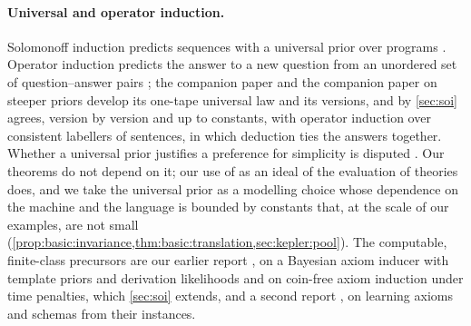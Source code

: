 \paragraph{Universal and operator induction.}
Solomonoff induction predicts sequences with a universal prior over programs \citep{solomonoff1964formal,solomonoff1978complexity,li2008introduction}. Operator induction predicts the answer to a new question from an unordered set of question--answer pairs \citep{solomonoff1999two,solomonoff2008three}; the companion paper \citep{claudeSFI2026fundamentals} and the companion paper on steeper priors \citep{claudeSFI2026steeper} develop its one-tape universal law and its versions, and by \cref{sec:soi} \SAIabbr agrees, version by version and up to constants, with operator induction over consistent labellers of sentences, in which deduction ties the answers together. Whether a universal prior justifies a preference for simplicity is disputed \citep{sterkenburg2016solomonoff,sterkenburg2019putnam}. Our theorems do not depend on it; our use of \SAIabbr as an ideal of the evaluation of theories does, and we take the universal prior as a modelling choice whose dependence on the machine and the language is bounded by constants that, at the scale of our examples, are not small (\cref{prop:basic:invariance,thm:basic:translation,sec:kepler:pool}). The computable, finite-class precursors are our earlier report \citep{claude2026axiominduction}, on a Bayesian axiom inducer with template priors and derivation likelihoods and on coin-free axiom induction under time penalties, which \cref{sec:soi} extends, and a second report \citep{claude2026axiomschemas}, on learning axioms and schemas from their instances.

